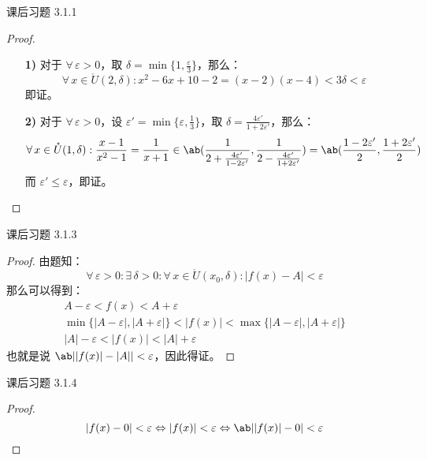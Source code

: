 \begin{problem}
	课后习题 3.1.1
	
	\begin{proof}
		\begin{enumerate}
			\item[\textbf{1)}] 对于 $\forall\,\varepsilon > 0$，取 $\delta = \min\{1, \frac{\varepsilon}{3}\}$，那么：
			$$
			\forall\,x \in \mathring{U}(2, \delta): x^2 - 6x + 10 - 2 = (x - 2)(x - 4) < 3 \delta < \varepsilon 
			$$
			即证。

			\item[\textbf{2)}] 对于 $\forall\,\varepsilon > 0$，设 $\varepsilon' = \min\{\varepsilon, \frac{1}{3}\}$，取 $\delta = \frac{4\varepsilon'}{1 + 2 \varepsilon'}$，那么：
			$$
			\forall\,x \in \mathring{U}(1, \delta): \frac{x - 1}{x^2 - 1} = \frac{1}{x + 1} \in \ab(\frac{1}{2 + \frac{4\varepsilon'}{1 - 2\varepsilon'}}, \frac{1}{2 - \frac{4\varepsilon'}{1 + 2\varepsilon'}}) = \ab(\frac{1 - 2\varepsilon'}{2}, \frac{1 + 2\varepsilon'}{2})
			$$
			而 $\varepsilon' \le \varepsilon$，即证。
		\end{enumerate}
	\end{proof}
\end{problem}

\begin{problem}
	课后习题 3.1.3

	\begin{proof}
		由题知：
		$$
		\forall\,\varepsilon > 0: \exists\,\delta > 0: \forall\,x \in \mathring{U}(x_0, \delta): |f(x) - A| < \varepsilon
		$$
		那么可以得到：
		$$
		\begin{gathered}
			A - \varepsilon < f(x) < A + \varepsilon \\
			\min\{|A - \varepsilon|, |A + \varepsilon|\} < |f(x)| < \max\{|A - \varepsilon|, |A + \varepsilon|\} \\
			|A| - \varepsilon < |f(x)| < |A| + \varepsilon
		\end{gathered}
		$$
		也就是说 $\ab||f(x)|-|A|| < \varepsilon$，因此得证。
	\end{proof}
\end{problem}

\begin{problem}
	课后习题 3.1.4

	\begin{proof}
		$$
		|f(x) - 0| < \varepsilon \Leftrightarrow |f(x)| < \varepsilon \Leftrightarrow \ab||f(x)| - 0| < \varepsilon
		$$
	\end{proof}
\end{problem}

